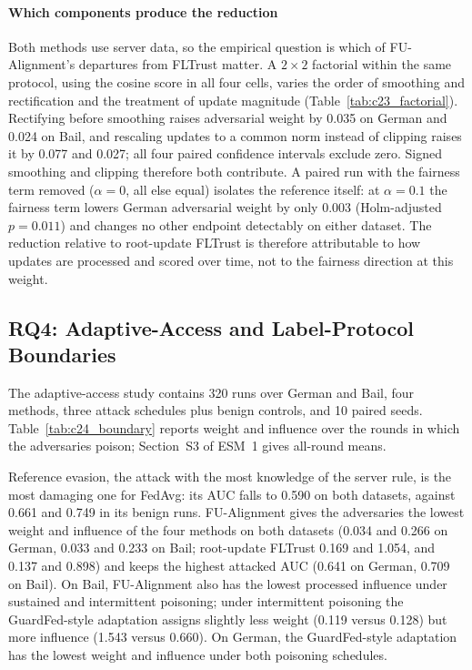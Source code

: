 \paragraph{Which components produce the reduction}
Both methods use server data, so the empirical question is which of FU-Alignment's departures from FLTrust matter. A $2 \times 2$ factorial within the same protocol, using the cosine score in all four cells, varies the order of smoothing and rectification and the treatment of update magnitude (Table~\ref{tab:c23_factorial}). Rectifying before smoothing raises adversarial weight by 0.035 on German and 0.024 on Bail, and rescaling updates to a common norm instead of clipping raises it by 0.077 and 0.027; all four paired confidence intervals exclude zero. Signed smoothing and clipping therefore both contribute. A paired run with the fairness term removed ($\alpha = 0$, all else equal) isolates the reference itself: at $\alpha = 0.1$ the fairness term lowers German adversarial weight by only 0.003 (Holm-adjusted $p = 0.011$) and changes no other endpoint detectably on either dataset. The reduction relative to root-update FLTrust is therefore attributable to how updates are processed and scored over time, not to the fairness direction at this weight.

\subsection{RQ4: Adaptive-Access and Label-Protocol Boundaries}
\label{subsec:rq4_boundary}

The adaptive-access study contains 320 runs over German and Bail, four methods, three attack schedules plus benign controls, and 10 paired seeds. Table~\ref{tab:c24_boundary} reports weight and influence over the rounds in which the adversaries poison; Section~S3 of ESM~1 gives all-round means.

Reference evasion, the attack with the most knowledge of the server rule, is the most damaging one for FedAvg: its AUC falls to 0.590 on both datasets, against 0.661 and 0.749 in its benign runs. FU-Alignment gives the adversaries the lowest weight and influence of the four methods on both datasets (0.034 and 0.266 on German, 0.033 and 0.233 on Bail; root-update FLTrust 0.169 and 1.054, and 0.137 and 0.898) and keeps the highest attacked AUC (0.641 on German, 0.709 on Bail). On Bail, FU-Alignment also has the lowest processed influence under sustained and intermittent poisoning; under intermittent poisoning the GuardFed-style adaptation assigns slightly less weight (0.119 versus 0.128) but more influence (1.543 versus 0.660). On German, the GuardFed-style adaptation has the lowest weight and influence under both poisoning schedules.

